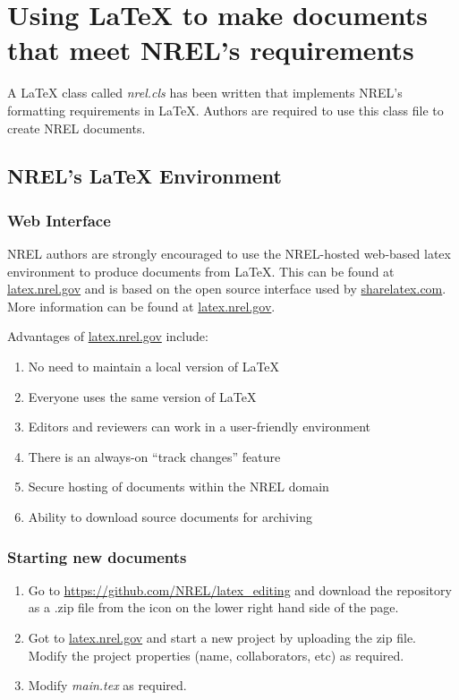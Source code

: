 \section{Using LaTeX to make documents that meet NREL's requirements}

A LaTeX class called \emph{nrel.cls} has been written that implements NREL's formatting requirements in LaTeX. Authors are required to use this class file to create NREL documents.

\subsection{NREL's LaTeX Environment}
\subsubsection{Web Interface}
NREL authors are strongly encouraged to use the NREL-hosted web-based latex environment to produce documents from LaTeX. This can be found at \href{latex.nrel.gov}{latex.nrel.gov} and is based on the open source interface used by \href{sharelatex.com}{sharelatex.com}. More information can be found at \href{latex.nrel.gov}{latex.nrel.gov}.

Advantages of \href{latex.nrel.gov}{latex.nrel.gov} include:
\begin{enumerate}
\item No need to maintain a local version of LaTeX
\item Everyone uses the same version of LaTeX
\item Editors and reviewers can work in a user-friendly environment
\item There is an always-on ``track changes'' feature
\item Secure hosting of documents within the NREL domain
\item Ability to download source documents for archiving
\end{enumerate}

\subsubsection{Starting new documents}
\begin{enumerate}
\item Go to \href{https://github.com/NREL/latex_editing}{https://github.com/NREL/latex\_editing} and download the repository as a .zip file from the icon on the lower right hand side of the page.
\item Got to \href{latex.nrel.gov}{latex.nrel.gov} and start a new project by uploading the zip file. Modify the project properties (name, collaborators, etc) as required.
\item Modify \emph{main.tex} as required.
\end{enumerate}

